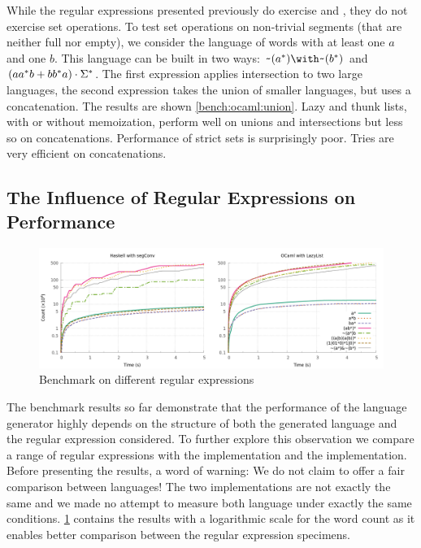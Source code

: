 While the regular expressions presented previously do exercise
 and , they do not exercise set
operations.  To test set operations on non-trivial segments (that are
neither full nor empty), we consider the language of words with at
least one $a$ and one $b$. This language can be built in two ways:
$\Rintersect{\Rcomplement{(\Rstar{a})}}{\Rcomplement{(\Rstar{b})}}$
and $(aa^*b +{bb^*a}) \cdot{\Sigma^*}$.
The first expression applies {intersection} to two large languages,
the second expression takes the union of smaller languages, but uses a
concatenation.  The results are shown \cref{bench:ocaml:union}.
Lazy and thunk lists, with or without
memoization, perform well on unions and intersections but less so
on concatenations. Performance of
strict sets is surprisingly poor.
Tries are very efficient on concatenations.


\subsection{The Influence of Regular Expressions on Performance}
\begin{figure}[!tp]
  \centering
  \includegraphics[width=\linewidth]{measure/langs.png}
  \caption{Benchmark on different regular expressions}
  \label{bench:langs}
\end{figure}

The benchmark results so far demonstrate that the performance of the language
generator highly depends on the structure of both
the generated language and the regular expression considered.
To further explore this observation we compare a range of regular expressions
with the  \haskell implementation and the 
\ocaml implementation.
Before presenting the results, a word of warning:
We do not claim to offer a fair comparison between languages!
The two implementations are not exactly the same and we made no attempt
to measure both language under exactly the same conditions.
%
\cref{bench:langs} contains the results with a
logarithmic scale for the word count as it enables better comparison
between the regular expression specimens.


